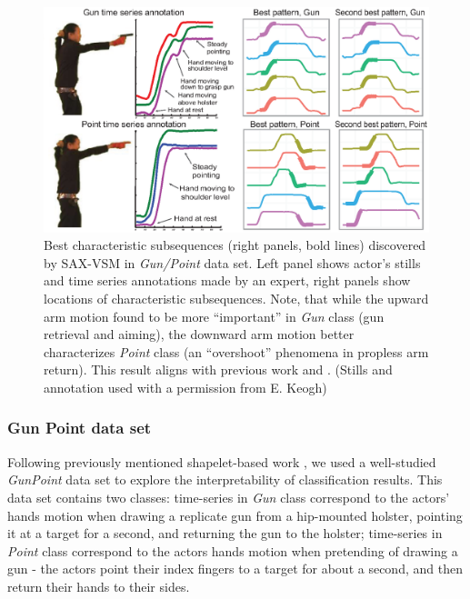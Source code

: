 \begin{figure}[b]
   \centering
   \includegraphics[width=140mm]{figures/gun-point.eps}
   \caption{Best characteristic subsequences (right panels, bold lines) discovered by SAX-VSM in
   \textit{Gun/Point} data set. 
   Left panel shows actor's stills and time series annotations made by an expert, 
   right panels show locations of characteristic subsequences.
   Note, that while the upward arm motion found to be more ``important'' in \textit{Gun} 
   class (gun retrieval and aiming), the downward arm motion better characterizes 
   \textit{Point} class (an ``overshoot'' phenomena in propless arm return). 
   This result aligns with previous work \cite{citeulike:7344347} and \cite{citeulike:11345338}.
   (Stills and annotation used with a permission from E. Keogh) }
   \label{fig:shapelet-like-patterns}
\end{figure}

\subsubsection{Gun Point data set}
Following previously mentioned shapelet-based work \cite{citeulike:7344347, citeulike:11345338}, 
we used a well-studied \textit{GunPoint} data set \cite{DBLP:conf/sdm/RatanamahatanaK04} to explore the 
interpretability of classification results. This data set contains two classes: 
time-series in \textit{Gun} class correspond to the actors' hands motion when drawing
a replicate gun from a hip-mounted holster, pointing it at a target for a second,
and returning the gun to the holster; 
time-series in \textit{Point} class correspond to the actors hands motion when pretending
of drawing a gun - the actors point their index fingers to a target for about a second, 
and then return their hands to their sides. 


